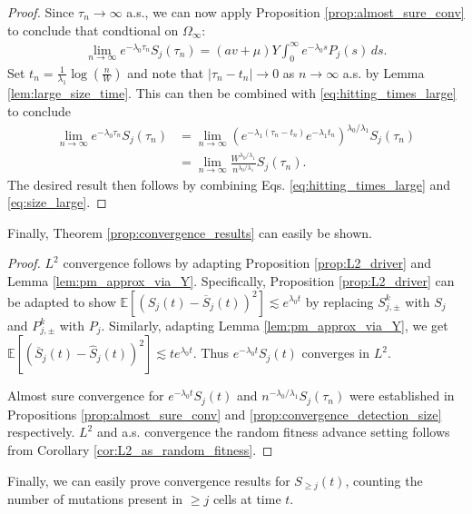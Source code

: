 \documentclass{article}
\numberwithin{equation}{section}
\begin{document}
\begin{proof}
Since $\tau_n\to\infty$ a.s., we can now apply Proposition \ref{prop:almost_sure_conv} to conclude that condtional on $\Omega_\infty$:
  \begin{align}
    \lim_{n\to\infty} e^{-\lambda_0\tau_n}S_j(\tau_n)=(av+\mu)Y\int_0^\infty e^{-\lambda_0 s}P_j(s)\,ds\label{eq:hitting_times_large}.
  \end{align}
    Set $t_n=\frac{1}{\lambda_1}\log\left(\frac{n}{W}\right)$ and note that $|\tau_n-t_n|\to 0$ as $n\to\infty$ a.s. by Lemma \ref{lem:large_size_time}. This can then be combined with \eqref{eq:hitting_times_large} to conclude
    \begin{align}
        \lim_{n\to\infty} e^{-\lambda_0\tau_n}S_j(\tau_n)&=\lim_{n\to\infty} \left(e^{-\lambda_1(\tau_n-t_n)}e^{-\lambda_1t_n}\right)^{\lambda_0/\lambda_1}S_j(\tau_n)\nonumber\\
        &=\lim_{n\to\infty}\frac{W^{\lambda_0/\lambda_1}}{n^{\lambda_0/\lambda_1}}S_j(\tau_n).\label{eq:size_large}
    \end{align}
The desired result then follows by combining Eqs. \ref{eq:hitting_times_large} and \ref{eq:size_large}.
\end{proof}

Finally, Theorem \ref{prop:convergence_results} can easily be shown.

\ConvergenceResults*

\begin{proof}
  $L^2$ convergence follows by adapting Proposition \ref{prop:L2_driver} and Lemma \ref{lem:pm_approx_via_Y}. Specifically, Proposition \ref{prop:L2_driver} can be adapted to show $\mathbb{E}\left[\left(S_j(t)-\overline{S}_j(t)\right)^2\right]\lesssim e^{\lambda_0 t}$ by replacing $S_{j,\pm}^{k}$ with $S_j$ and $P_{j,\pm}^{k}$ with $P_j$. Similarly, adapting Lemma \ref{lem:pm_approx_via_Y}, we get $\mathbb{E}\left[(\overline{S}_j(t)-\widehat{S}_j(t))^2\right]\lesssim te^{\lambda_0 t}$. Thus $e^{-\lambda_0 t}S_j(t)$ converges in $L^2$.
  
  Almost sure convergence for $e^{-\lambda_0 t}S_j(t)$ and $n^{-\lambda_0/\lambda_1}S_j(\tau_n)$ were established in Propositions \ref{prop:almost_sure_conv} and \ref{prop:convergence_detection_size} respectively. $L^2$ and a.s. convergence the random fitness advance setting follows from Corollary \ref{cor:L2_as_random_fitness}. 
\end{proof}

Finally, we can easily prove convergence results for $S_{\geq j}(t)$, counting the number of mutations present in $\geq j$ cells at time $t$.
\end{document}
